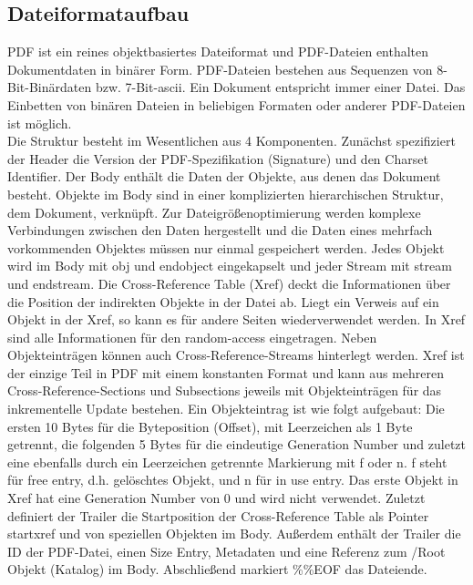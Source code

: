 \subsection{Dateiformataufbau}
PDF ist ein reines objektbasiertes Dateiformat und PDF-Dateien enthalten Dokumentdaten in binärer Form. PDF-Dateien bestehen aus Sequenzen von 8-Bit-Binärdaten bzw. 7-Bit-\gls{ascii}. \cite{schneeberger} Ein Dokument entspricht immer einer Datei. Das Einbetten von binären Dateien in beliebigen Formaten oder anderer PDF-Dateien ist möglich. \\
Die Struktur besteht im Wesentlichen aus 4 Komponenten. Zunächst spezifiziert der Header die Version der PDF-Spezifikation (Signature) und den Charset Identifier. \cite{ccc-pdf-secrets} Der Body enthält die Daten der Objekte, aus denen das Dokument besteht. Objekte im Body sind in einer komplizierten hierarchischen Struktur, dem Dokument, verknüpft. Zur Dateigrößenoptimierung werden komplexe Verbindungen zwischen den Daten hergestellt und die Daten eines mehrfach vorkommenden Objektes müssen nur einmal gespeichert werden. \cite{softx} Jedes Objekt wird im Body mit obj und endobject eingekapselt und jeder Stream mit stream und endstream. \cite{schneeberger} Die Cross-Reference Table (Xref) deckt die Informationen über die Position der indirekten Objekte in der Datei ab. Liegt ein Verweis auf ein Objekt in der Xref, so kann es für andere Seiten wiederverwendet werden. In Xref sind alle Informationen für den random-access eingetragen. Neben Objekteinträgen können auch Cross-Reference-Streams hinterlegt werden. Xref ist der einzige Teil in PDF mit einem konstanten Format und kann aus mehreren Cross-Reference-Sections und Subsections jeweils mit Objekteinträgen für das inkrementelle Update bestehen. Ein Objekteintrag ist wie folgt aufgebaut: Die ersten 10 Bytes für die Byteposition (Offset), mit Leerzeichen als 1 Byte getrennt, die folgenden 5 Bytes für die eindeutige Generation Number und zuletzt eine ebenfalls durch ein Leerzeichen getrennte Markierung mit f oder n. f steht für free entry, d.h. gelöschtes Objekt, und n für in use entry. Das erste Objekt in Xref hat eine Generation Number von 0 und wird nicht verwendet. \cite{ccc-break-pdf} Zuletzt definiert der Trailer die Startposition der Cross-Reference Table als Pointer startxref und von speziellen Objekten im Body. \cite{ccc-break-pdf} Außerdem enthält der Trailer die ID der PDF-Datei, einen Size Entry, Metadaten und eine Referenz zum /Root Objekt (Katalog) im Body. Abschließend markiert \%\%EOF das Dateiende. \cite{ccc-break-pdf, ccc-pdf-secrets}
